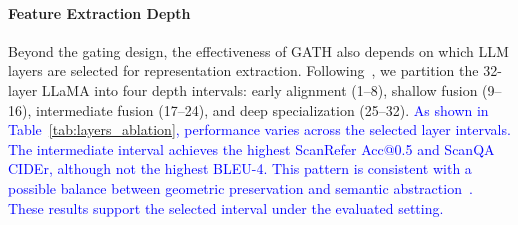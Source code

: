 \documentclass[lettersize,journal]{IEEEtran}
\begin{document}
\begin{table}[htbp]
\centering
\footnotesize  
\setlength{\tabcolsep}{3.8pt}
\caption{\textbf{Ablation Study on Feature Aggregation Strategy.}}
\label{tab:aggregation_ablation}
\end{table}

\paragraph*{Feature Extraction Depth} Beyond the gating design, the effectiveness of GATH also depends on which LLM layers are selected for representation extraction. Following~\cite{lbt2025}, we partition the 32-layer LLaMA into four depth intervals: early alignment (1--8), shallow fusion (9--16), intermediate fusion (17--24), and deep specialization (25--32). \textcolor{blue}{As shown in Table~\ref{tab:layers_ablation}, performance varies across the selected layer intervals.} \textcolor{blue}{The intermediate interval achieves the highest ScanRefer Acc@0.5 and ScanQA CIDEr, although not the highest BLEU-4. This pattern is consistent with a possible balance between geometric preservation and semantic abstraction~\cite{liu2019linguistic,voita2019bottom}. These results support the selected interval under the evaluated setting.}

\end{document}
